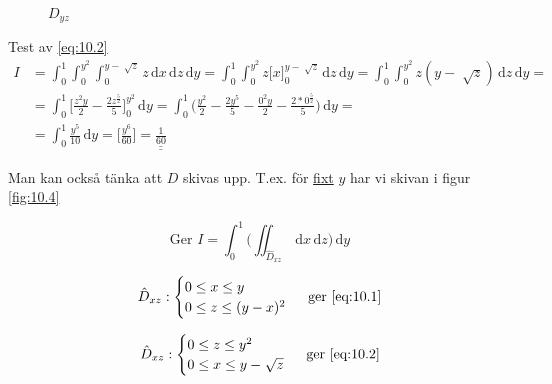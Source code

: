 \documentclass[a4paper]{article}
\newcommand{\svar}[1]{\underline{\underline{#1}}}
\let\oldsqrt\sqrt
\renewcommand*{\sqrt}[2][\ ]{\oldsqrt[#1]{#2} }
\begin{document}
\begin{figure}[ht]
  \caption{$D_{yz}$} \label{fig:10.5}
\end{figure}

\newpage
Test av \eqref{eq:10.2}
\begin{align*}
	I &= \int_0^1 \int_0^{y^2} \int_0^{y-\sqrt{z}} z \,\mathrm{d}x\,\mathrm{d}z\,\mathrm{d}y =
	\int_0^1 \int_0^{y^2} z \Big[x\Big]_0^{y-\sqrt{z}} \,\mathrm{d}z\,\mathrm{d}y=
	\int_0^1 \int_0^{y^2} z(y-\sqrt{z}) \,\mathrm{d}z\,\mathrm{d}y = \\
	&= \int_0^1 \Big[ \frac{z^2y}{2} - \frac{2z^{\frac{5}{2}}}{5} \Big]_0^{y^2} \,\mathrm{d}y =
	\int_0^1 \Big( \frac{y^2}{2} - \frac{2y^5}{5} - \frac{0^2y}{2} - \frac{2*0^{\frac{5}{2}}}{5} \Big) \,\mathrm{d}y = \\
	&= \int_0^1 \frac{y^5}{10} \,\mathrm{d}y =
	\Big[ \frac{y^6}{60} \Big] = \svar{\frac{1}{60}}
\end{align*}

Man kan också tänka att $D$ skivas upp. T.ex. för \underline{fixt} $y$ har vi skivan i figur \vref{fig:10.4}

$$
	\text{Ger } I = \int_0^1 \Big( \iint_{\hat{D}_{xz}} \,\mathrm{d}x\,\mathrm{d}z \Big)\,\mathrm{d}y
$$

$$
	\hat{D}_{xz} :
	\begin{cases}
		0 \leq x \leq y \\
		0 \leq z \leq (y-x)^2
	\end{cases}
	\text{ ger } \eqref{eq:10.1}
$$

$$
	\hat{D}_{xz} :
	\begin{cases}
		0 \leq z \leq y^2 \\
		0 \leq x \leq y-\sqrt{z}
	\end{cases}
	\text{ ger } \eqref{eq:10.2}
$$
\end{document}
